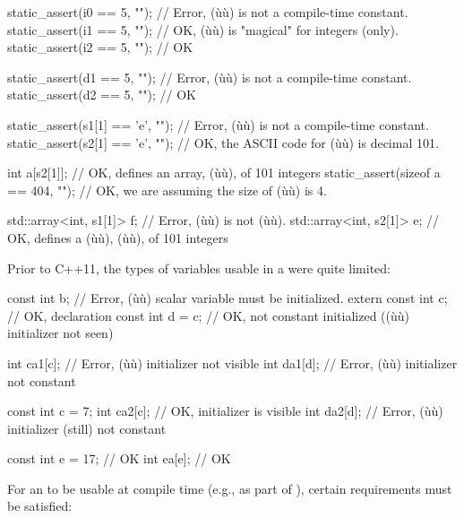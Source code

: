 \begin{emcppslisting}[emcppsbatch=e1]
static_assert(i0 == 5, "");         // Error, (ù{}ù) is not a compile-time constant.
static_assert(i1 == 5, "");         // OK, (ù{}ù) is "magical" for integers (only).
static_assert(i2 == 5, "");         // OK

static_assert(d1 == 5, "");         // Error, (ù{}ù) is not a compile-time constant.
static_assert(d2 == 5, "");         // OK

static_assert(s1[1] == 'e', "");    // Error, (ù{}ù) is not a compile-time constant.
static_assert(s2[1] == 'e', "");    // OK, the ASCII code for (ù{}ù) is decimal 101.

int a[s2[1]];                       // OK, defines an array, (ù{}ù), of 101 integers
static_assert(sizeof a == 404, ""); // OK, we are assuming the size of (ù{}ù) is 4.

std::array<int, s1[1]> f;           // Error, (ù{}ù) is not (ù{}ù).
std::array<int, s2[1]> e;           // OK, defines a (ù{}ù), (ù{}ù), of 101 integers
\end{emcppslisting}

\noindent Prior to C++11, the types of variables usable in a  were quite limited:

\begin{emcppslisting}
const int b;         // Error, (ù{}ù) scalar variable must be initialized.
extern const int c;  // OK, declaration
const int d = c;     // OK, not constant initialized ((ù{}ù) initializer not seen)

int ca1[c];          // Error, (ù{}ù) initializer not visible
int da1[d];          // Error, (ù{}ù) initializer not constant

const int c = 7;
int ca2[c];          // OK, initializer is visible
int da2[d];          // Error, (ù{}ù) initializer (still) not constant

const int e = 17;    // OK
int ea[e];           // OK
\end{emcppslisting}

\noindent For an  to be usable at compile time (e.g., as
part of ), certain requirements must be
satisfied:

